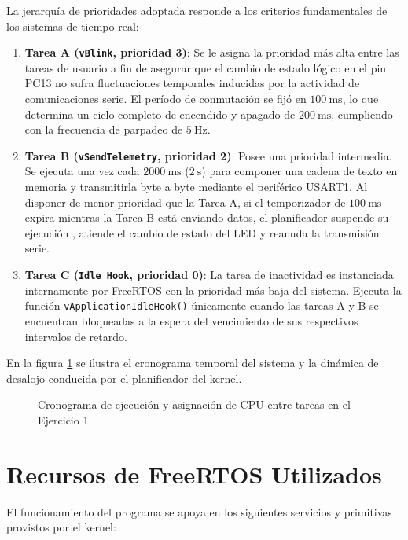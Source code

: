 La jerarquía de prioridades adoptada responde a los criterios fundamentales de los sistemas de tiempo real:

\begin{enumerate}
  \item \textbf{Tarea A (\texttt{vBlink}, prioridad 3)}: Se le asigna la prioridad más alta entre las tareas de usuario
    a fin de asegurar que el cambio de estado lógico en el pin PC13 no sufra fluctuaciones temporales inducidas
    por la actividad de comunicaciones serie. El período de conmutación se fijó en $\SI{100}{\milli\second}$, lo que
    determina un ciclo completo de encendido y apagado de $\SI{200}{\milli\second}$, cumpliendo con la frecuencia de
    parpadeo de $\SI{5}{\hertz}$.
  \item \textbf{Tarea B (\texttt{vSendTelemetry}, prioridad 2)}: Posee una prioridad intermedia. Se ejecuta una vez cada
    $\SI{2000}{\milli\second}$ ($\SI{2}{\second}$) para componer una cadena de texto en memoria y transmitirla byte a
    byte mediante el periférico USART1. Al disponer de menor prioridad que la Tarea A, si el temporizador de
    $\SI{100}{\milli\second}$ expira mientras la Tarea B está enviando datos, el planificador suspende su ejecución ,
    atiende el cambio de estado del LED y reanuda la transmisión serie.
  \item \textbf{Tarea C (\texttt{Idle Hook}, prioridad 0)}: La tarea de inactividad es instanciada internamente por
    FreeRTOS con la prioridad más baja del sistema. Ejecuta la función \texttt{vApplicationIdleHook()} únicamente cuando
    las tareas A y B se encuentran bloqueadas a la espera del vencimiento de sus respectivos intervalos de retardo.
\end{enumerate}

En la figura \ref{fig.ej1:cronograma} se ilustra el cronograma temporal del sistema y la dinámica de desalojo
conducida por el planificador del kernel.

\begin{figure}[!ht]
\centering

\caption{Cronograma de ejecución y asignación de CPU entre tareas en el Ejercicio 1.}
\label{fig.ej1:cronograma}
\end{figure}

\section{Recursos de FreeRTOS Utilizados}
\label{sec.ej1:recursos}

El funcionamiento del programa se apoya en los siguientes servicios y primitivas provistos por el kernel:

